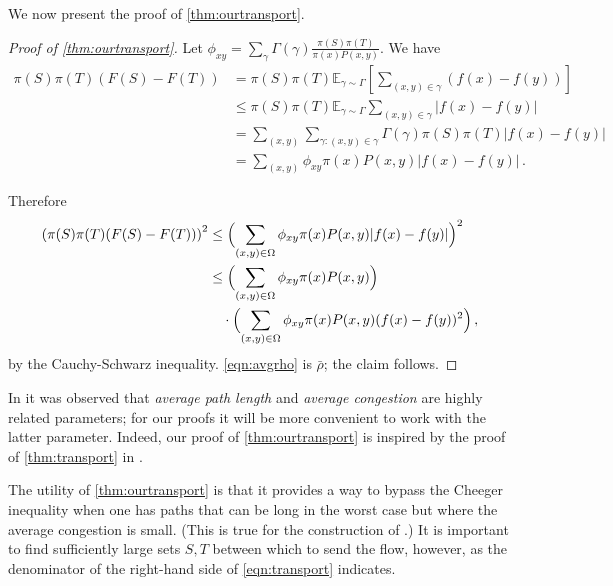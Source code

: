 \documentclass[a4paper, 12p]{article}
\numberwithin{equation}{section}
\newcommand{\Exp}{\mathbb{E}}
\newcommand{\FF}{F}
\begin{document}
We now present the proof of \cref{thm:ourtransport}.
\begin{proof}[Proof of \cref{thm:ourtransport}]
    Let $\phi_{xy} = \sum_{\gamma} \Gamma(\gamma) \frac{\pi(S)\pi(T)}{\pi(x)P(x, y)}$. We have
    \begin{align}
        \pi(S)\pi(T)(\FF(S) - \FF(T)) &= \pi(S)\pi(T)\Exp_{\gamma \sim \Gamma} \left[\sum_{(x, y) \in \gamma} (f(x) - f(y))\right] \nonumber \\
        &\leq \pi(S)\pi(T)\Exp_{\gamma \sim \Gamma} \sum_{(x, y) \in \gamma}|f(x) - f(y)| \nonumber \\
        &= \sum_{(x, y)} \sum_{\gamma: (x, y) \in \gamma}\Gamma(\gamma)\pi(S)\pi(T)|f(x) - f(y)| \nonumber \\
        &= \sum_{(x, y)} \phi_{xy}\pi(x)P(x, y)|f(x) - f(y)|\,.
    \end{align}

    Therefore
    \begin{align}
        \left(\pi(S)\pi(T)(\FF(S) - \FF(T))\right)^2 & \leq \Bigl( \sum_{(x, y) \in \Omega} \phi_{xy}\pi(x)P(x, y)|f(x) - f(y)| \Bigr)^2 \nonumber \\
        &\leq \Bigl(\sum_{(x, y) \in \Omega} \phi_{xy}\pi(x)P(x, y)\Bigr) \label{eqn:avgrho} \\
        &\quad \cdot \Bigl( \sum_{(x, y) \in \Omega} \phi_{xy}\pi(x)P(x, y)(f(x) - f(y))^2\Bigr)\,,  \label{eqn:rho}
    \end{align}
    by the Cauchy-Schwarz inequality. \eqref{eqn:avgrho} is $\bar\rho$; the claim follows.
\end{proof}
In \cite{montenegrovc} it was observed that \emph{average path length} and \emph{average congestion} are highly related parameters; for our proofs it will be more convenient to work with the latter parameter. Indeed, our proof of \cref{thm:ourtransport} is inspired by the proof of \cref{thm:transport} in \cite{weimingjs}.

The utility of \cref{thm:ourtransport} is that it provides a way to bypass the Cheeger inequality when one has paths that can be long in the worst case but where the average congestion is small. (This is true for the construction of \cite{eppstein2022improved}.) It is important to find sufficiently large sets $S, T$ between which to send the flow, however, as the denominator of the right-hand side of \eqref{eqn:transport} indicates.
\end{document}
